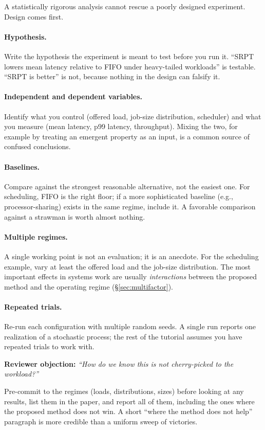 \documentclass[11pt]{article}
\newenvironment{reviewerbox}[1]{%
    \begin{shaded*}\noindent\textbf{Reviewer objection: }\textit{#1}\par\smallskip
}{%
    \end{shaded*}%
}
\begin{document}
A statistically rigorous analysis cannot rescue a poorly designed experiment. Design comes first.

\paragraph{Hypothesis.} Write the hypothesis the experiment is meant to test before you run it. ``SRPT lowers mean latency relative to FIFO under heavy-tailed workloads'' is testable. ``SRPT is better'' is not, because nothing in the design can falsify it.

\paragraph{Independent and dependent variables.} Identify what you control (offered load, job-size distribution, scheduler) and what you measure (mean latency, p99 latency, throughput). Mixing the two, for example by treating an emergent property as an input, is a common source of confused conclusions.

\paragraph{Baselines.} Compare against the strongest reasonable alternative, not the easiest one. For scheduling, FIFO is the right floor; if a more sophisticated baseline (e.g., processor-sharing) exists in the same regime, include it. A favorable comparison against a strawman is worth almost nothing.

\paragraph{Multiple regimes.} A single working point is not an evaluation; it is an anecdote. For the scheduling example, vary at least the offered load and the job-size distribution. The most important effects in systems work are usually \emph{interactions} between the proposed method and the operating regime (\S\ref{sec:multifactor}).

\paragraph{Repeated trials.} Re-run each configuration with multiple random seeds. A single run reports one realization of a stochastic process; the rest of the tutorial assumes you have repeated trials to work with.

\begin{reviewerbox}{``How do we know this is not cherry-picked to the workload?''}
Pre-commit to the regimes (loads, distributions, sizes) before looking at any results, list them in the paper, and report all of them, including the ones where the proposed method does not win. A short ``where the method does not help'' paragraph is more credible than a uniform sweep of victories.
\end{reviewerbox}
\end{document}
